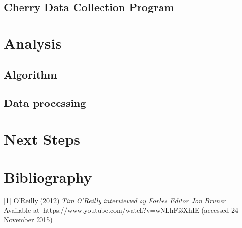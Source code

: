 \documentclass[11pt, oneside]{article}   	%
\begin{document}
\subsection{Cherry Data Collection Program}
\label{sec:CHERRY}

\label{sec:COLLECTIONSTRATEGY}
\section{Analysis}
\label{sec:ANALYSIS}
\subsection{Algorithm}
\subsection{Data processing}
\section{Next Steps}
\section{Bibliography}
[1] O'Reilly (2012) \emph{Tim O'Reilly interviewed by Forbes Editor Jon Bruner} Available at: https://www.youtube.com/watch?v=wNLhFi3XhIE (accessed 24 November 2015)
\end{document}
